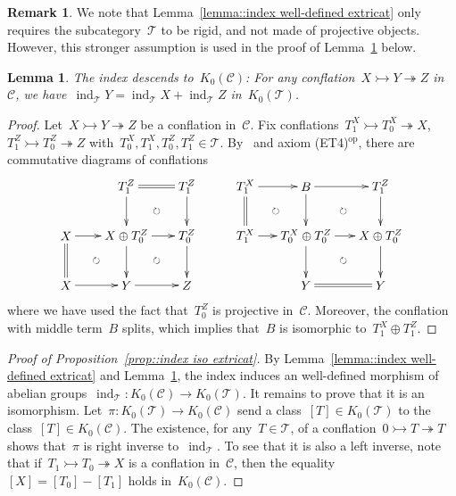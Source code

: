 \documentclass{amsart}
\newtheorem{lemma}[theorem]{Lemma}
\theoremstyle{definition}
\newtheorem{remark}[theorem]{Remark}
\newcommand{\cat}{\mathcal{C}}
\newcommand{\ind}{\operatorname{ind}}
\newcommand{\tc}{\mathcal{T}}
\newcommand{\infl}{\rightarrowtail}
\newcommand{\defl}{\twoheadrightarrow}
\newcommand{\kzero}[1]{K_0(#1)}
\begin{document}
\begin{remark}
We note that Lemma~\ref{lemma::index well-defined extricat} only requires the subcategory~$\tc$ to be rigid, and not made of projective objects.
However, this stronger assumption is used in the proof of Lemma~\ref{lemma::index kzero extricat} below.
\end{remark}

\begin{lemma}
\label{lemma::index kzero extricat}
 The index descends to~$\kzero{\cat}$: For any conflation~$X\infl Y\defl Z$ in~$\cat$, we have~$\ind_\tc Y = \ind_\tc X + \ind_\tc Z$ in~$\kzero{\tc}$.
\end{lemma}

\begin{proof}
Let~$X\infl Y\defl Z$ be a conflation in~$\cat$.
Fix conflations~$T_1^X \infl T_0^X \defl X$,~$T_1^Z\infl T_0^Z \defl Z$ with~$T_0^X, T_1^X, T_0^Z, T_1^Z\in\tc$.
By~\cite[Proposition 3.15]{NakaokaPalu} and axiom (ET4)$^{\mathrm{op}}$, there are commutative diagrams of conflations
\[
\xy
%
(-7,21)*+{T^Z_1}="-12";
(10,21)*+{T^Z_1}="-14";
%
(-24,7)*+{X}="0";
(-7,7)*+{X\oplus T^Z_0}="2";
(10,7)*+{T^Z_0}="4";
%
(-24,-7)*+{X}="10";
(-7,-7)*+{Y}="12";
(10,-7)*+{Z}="14";
%
{\ar@{=} "-12";"-14"};
%
{\ar "-12";"2"};
{\ar "-14";"4"};
%
{\ar "0";"2"};
{\ar "2";"4"};
%
{\ar@{=} "0";"10"};
{\ar "2";"12"};
{\ar "4";"14"};
%
{\ar "10";"12"};
{\ar "12";"14"};
%
{\ar@{}|\circlearrowright "-12";"4"};
{\ar@{}|\circlearrowright "0";"12"};
{\ar@{}|\circlearrowright "2";"14"};
\endxy
\ \ \ \ \ \ \ \
\xy
(-24,21)*+{T^X_1}="0";
(-7,21)*+{B}="2";
(14,21)*+{T^Z_1}="4";
%
(-24,7)*+{T^X_1}="10";
(-7,7)*+{T^X_0\oplus T^Z_0}="12";
(14,7)*+{X\oplus T^Z_0}="14";
%
(-7,-7)*+{Y}="22";
(14,-7)*+{Y}="24";
%
%
{\ar "0";"2"};
{\ar "2";"4"};
%
{\ar@{=} "0";"10"};
{\ar "2";"12"};
{\ar "4";"14"};
%
{\ar "10";"12"};
{\ar "12";"14"};
%
{\ar "12";"22"};
{\ar "14";"24"};
%
{\ar@{=} "22";"24"};
%
{\ar@{}|\circlearrowright "0";"12"};
{\ar@{}|\circlearrowright "2";"14"};
{\ar@{}|\circlearrowright "12";"24"};
\endxy
\]
where we have used the fact that~$T_0^Z$ is projective in~$\cat$.
Moreover, the conflation with middle term~$B$ splits, which implies that~$B$ is isomorphic to~$T_1^X\oplus T_1^Z$.
\end{proof}

\begin{proof}[Proof of Proposition~\ref{prop::index iso extricat}]
 By Lemma~\ref{lemma::index well-defined extricat} and Lemma~\ref{lemma::index kzero extricat}, the index induces an well-defined morphism of abelian groups~$\ind_\tc:\kzero{\cat}\to\kzero{\tc}$.
 It remains to prove that it is an isomorphism.
 Let~$\pi:\kzero{\tc}\to\kzero{\cat}$ send a class~$[T]\in\kzero{\tc}$ to the class~$[T]\in\kzero{\cat}$.
 The existence, for any~$T\in\tc$, of a conflation~$0\infl T\defl T$ shows that~$\pi$ is right inverse to~$\ind_\tc$.
 To see that it is also a left inverse, note that if~$T_1\infl T_0\defl X$ is a conflation in~$\cat$, then the equality~$[X]=[T_0]-[T_1]$ holds in~$\kzero{\cat}$.
\end{proof}
\end{document}
